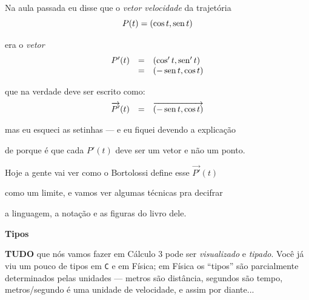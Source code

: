 \documentclass[oneside,12pt]{article}
\begin{document}
\newpage




Na aula passada eu disse que o {\sl vetor velocidade} da trajetória
%
$$P(t) = (\cos t, \operatorname{sen} t)$$

era o {\sl vetor}
%
$$\begin{array}{rcl}
  P'(t) &=& (\cos' t, \operatorname{sen}' t) \\
        &=& (-\operatorname{sen} t, \cos t) \\
  \end{array}
$$

que na verdade deve ser escrito como:
%
$$\begin{array}{rcl}
  \overrightarrow{P'}(t) &=& {\overrightarrow{(-\operatorname{sen} t, \cos t)}} \\
  \end{array}
$$

mas eu esqueci as setinhas --- e eu fiquei devendo a explicação

de porque é que cada $P'(t)$ deve ser um vetor e não um ponto.

Hoje a gente vai ver como o Bortolossi define esse $\Vec{P'}(t)$

como um limite, e vamos ver algumas técnicas pra decifrar

a linguagem, a notação e as figuras do livro dele.

\newpage


{\bf Tipos}

\ssk

{\bf TUDO} que nós vamos fazer em Cálculo 3 pode ser {\sl visualizado}
e {\sl tipado}. Você já viu um pouco de tipos em {\tt C} e em Física;
em Física os ``tipos'' são parcialmente determinados pelas unidades
--- metros são distância, segundos são tempo, metros/segundo é uma
unidade de velocidade, e assim por diante...
\end{document}
